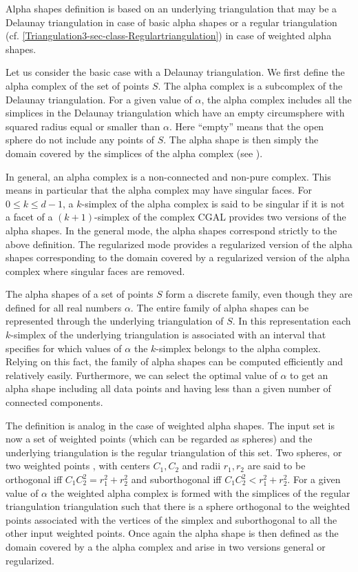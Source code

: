 Alpha shapes definition is based on an underlying
triangulation that may be a Delaunay triangulation 
in case of basic alpha shapes or a regular triangulation 
(cf. \ref{Triangulation3-sec-class-Regulartriangulation})
in case of weighted alpha shapes.

Let us consider the basic case with a Delaunay triangulation.
We first define the alpha complex  of the set of points $S$. 
The  alpha complex is a subcomplex 
of the Delaunay triangulation.
For a given value of $\alpha$, the alpha complex includes
all the simplices in the Delaunay triangulation which have
an empty  circumsphere with squared radius equal or smaller than $\alpha$.
Here ``empty'' means  that the open sphere 
do not include  any points of $S$.
The alpha shape is then simply the domain covered by the simplices
of the alpha complex (see \cite{em-tdas-94}).

In general, an alpha complex is a non-connected and non-pure complex.
This means in particular that the alpha complex may have
singular faces.  For $0 \leq k \leq d-1$,
a $k$-simplex of the alpha complex  is said to be
singular if it is not a facet of a $(k+1)$-simplex of the complex
CGAL provides two versions of the alpha shapes. In the general mode,
the alpha shapes correspond strictly to the above definition.
The regularized mode provides a regularized version of the alpha shapes
corresponding to the domain covered by a regularized version
of the alpha complex where singular faces are removed.

The alpha shapes of a  set of points 
$S$ form a discrete family, even though they
are defined for all real numbers $\alpha$.
The entire family of alpha shapes can be represented 
through  the underlying triangulation of $S$. In this representation
each $k$-simplex of the underlying triangulation is associated with an
interval that specifies for which values of $\alpha$ the $k$-simplex
belongs to the alpha complex. Relying on this fact, the family of
 alpha shapes can be computed efficiently and relatively
easily. Furthermore, we can select the optimal value
of  $\alpha$ to get an alpha shape including all data points
and having   less than a given number of connected components.


The definition is analog in the case of weighted alpha shapes.
The input set is now a set of weighted points (which can be regarded
as spheres) and the underlying triangulation 
is the regular triangulation of this set.
Two spheres, or two weighted points , with centers $C_1, C_2$
and  radii $r_1, r_2 $ are said to be orthogonal iff 
$ C_1C_2 ^2 = r_1^2 + r_2^2$ and suborthogonal
iff  $ C_1C_2 ^2 < r_1^2 + r_2^2$.
For a given value of $\alpha$
the weighted alpha complex is formed with the simplices of the 
regular triangulation triangulation
such that there is a sphere orthogonal to the weighted points associated
with the vertices of the simplex  and suborthogonal to all the other
input weighted points. Once again the alpha shape is then defined as
the domain covered by a the alpha complex and arise in two versions
general or regularized.


